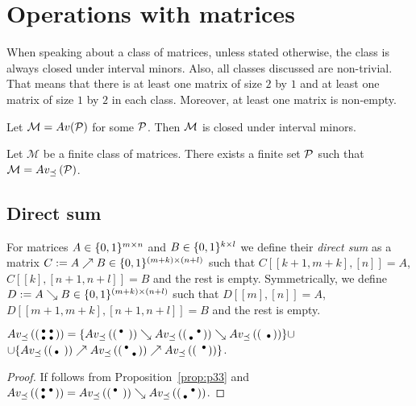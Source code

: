 \chapter{Operations with matrices}
When speaking about a class of matrices, unless stated otherwise, the class is always closed under interval minors. Also, all classes discussed are non-trivial. That means that there is at least one matrix of size $2$ by $1$ and at least one matrix of size $1$ by $2$ in each class. Moreover, at least one matrix is non-empty.

\begin{obs}
Let $\mathcal{M}=Av(\mathcal{P})$ for some $\mathcal{P}$. Then $\mathcal{M}$ is closed under interval minors.
\end{obs}

\begin{obs}
Let $\mathcal{M}$ be a finite class of matrices. There exists a finite set $\mathcal{P}$ such that $\mathcal{M}=Av_{\preceq}\left(\mathcal{P}\right)$.
\end{obs}

\section{Direct sum}

\begin{defn}
For matrices $A\in\{0,1\}^{m\times n}$ and $B\in\{0,1\}^{k\times l}$ we define their \emph{direct sum} as a matrix $C:=A\nearrow B\in\{0,1\}^{(m+k)\times(n+l)}$ such that $C[[k+1,m+k],[n]]=A$, $C[[k],[n+1,n+l]]=B$ and the rest is empty. Symmetrically, we define $D:=A\searrow B\in\{0,1\}^{(m+k)\times(n+l)}$ such that $D[[m],[n]]=A$, $D[[m+1,m+k],[n+1,n+l]]=B$ and the rest is empty.
\end{defn}

\begin{prop}
$Av_{\preceq}\left(\left(\begin{smallmatrix}\bullet&\bullet\\\bullet&\bullet\end{smallmatrix}\right)\right)=\{Av_{\preceq}\left(\left(\begin{smallmatrix}\bullet& \\ & \end{smallmatrix}\right)\right)\searrow Av_{\preceq}\left(\left(\begin{smallmatrix} &\bullet\\\bullet& \end{smallmatrix}\right)\right)\searrow Av_{\preceq}\left(\left(\begin{smallmatrix} & \\ &\bullet\end{smallmatrix}\right)\right)\}\cup$\\
$\cup\{Av_{\preceq}\left(\left(\begin{smallmatrix} & \\\bullet& \end{smallmatrix}\right)\right)\nearrow Av_{\preceq}\left(\left(\begin{smallmatrix}\bullet& \\ &\bullet\end{smallmatrix}\right)\right)\nearrow Av_{\preceq}\left(\left(\begin{smallmatrix} &\bullet\\ & \end{smallmatrix}\right)\right)\}$.
\end{prop}
\begin{proof}
If follows from Proposition~\ref{prop:p33} and $Av_{\preceq}\left(\left(\begin{smallmatrix}\bullet&\bullet\\\bullet& \end{smallmatrix}\right)\right)=Av_{\preceq}\left(\left(\begin{smallmatrix}\bullet& \\ & \end{smallmatrix}\right)\right)\searrow Av_{\preceq}\left(\left(\begin{smallmatrix} &\bullet\\\bullet& \end{smallmatrix}\right)\right)$.
\end{proof}

